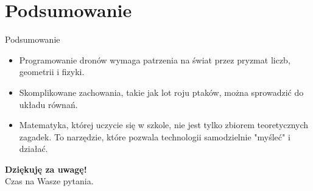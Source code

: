 \section{Podsumowanie}

\begin{frame}{Podsumowanie}
    \begin{itemize}
        \item Programowanie dronów wymaga patrzenia na świat przez pryzmat liczb, geometrii i fizyki.
        \item Skomplikowane zachowania, takie jak lot roju ptaków, można sprowadzić do układu równań.
        \item Matematyka, której uczycie się w szkole, nie jest tylko zbiorem teoretycznych zagadek. To narzędzie, które pozwala technologii samodzielnie "myśleć" i działać.
    \end{itemize}
    
    \vspace{0.5cm}
    \begin{center}
        \Large \textbf{Dziękuję za uwagę!} \\
        \normalsize Czas na Wasze pytania.
    \end{center}
\end{frame}
